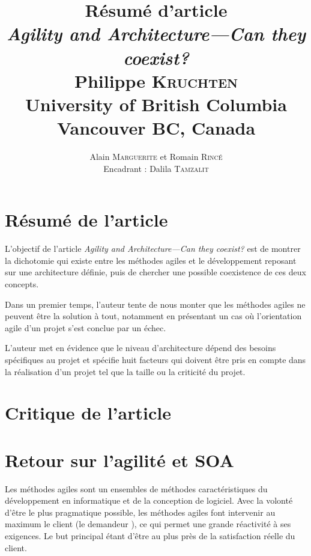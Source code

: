 \documentclass[11pt,a4paper,utf8x]{article}
\title{{\large \textbf{Résumé d'article}\\\emph{Agility and Architecture—Can they coexist?}\\\vspace{1ex}
 {\scriptsize Philippe \textsc{Kruchten}\\\vspace{0.5ex}University of British Columbia\\\vspace{-4ex}
Vancouver BC, Canada}}}
\author{\small Alain \textsc{Marguerite} et Romain \textsc{Rincé}\\{\small Encadrant : Dalila \textsc{Tamzalit}}}
\date{}
\begin{document}
\maketitle
\renewcommand{\labelitemi}{$\bullet$} 


\section{Résumé de l'article}\label{sec:res}
L'objectif de l'article \emph{Agility and Architecture—Can they coexist?}  \cite{krutchen} est de montrer la dichotomie qui existe entre les méthodes agiles et le développement reposant sur une architecture définie, puis de chercher une possible coexistence de ces deux concepts. 

Dans un premier temps, l'auteur tente de nous monter que les méthodes agiles ne peuvent être la solution à tout, notamment en présentant un cas où l'orientation agile d'un projet s'est conclue par un échec. 

L'auteur met en évidence que le \og niveau\fg{} d'architecture dépend des besoins spécifiques au projet et spécifie huit facteurs qui doivent être pris en compte dans la réalisation d'un projet tel que la taille ou la criticité du projet.

\section{Critique de l'article}\label{sec:cri}


\section{Retour sur l'agilité et SOA}\label{sec:ret}
Les méthodes agiles sont un ensembles de méthodes caractéristiques du développement en informatique et de la conception de logiciel. Avec la volonté d'être le plus pragmatique possible, les méthodes agiles font intervenir au maximum le client (le \og demandeur \fg{}), ce qui permet une grande réactivité à ses exigences. Le but principal étant d'être au plus près de la satisfaction réelle du client.
\end{document}
